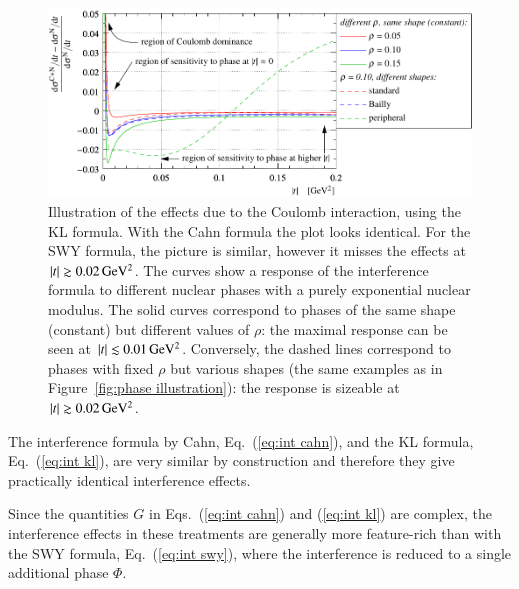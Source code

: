 \begin{figure}
\begin{center}
\includegraphics{fig/cni_effect_illustration.pdf}
\caption{%
Illustration of the effects due to the Coulomb interaction, using the KL formula. With the Cahn formula the plot looks identical. For the SWY formula, the picture is similar, however it misses the effects at $|t| \gtrsim 0.02\,{\rm GeV^2}$. The curves show a response of the interference formula to different nuclear phases with a purely exponential nuclear modulus. The solid curves correspond to phases of the same shape (constant) but different values of $\rho$: the maximal response can be seen at $|t| \lesssim 0.01\,{\rm GeV^2}$. Conversely, the dashed lines correspond to phases with fixed $\rho$ but various shapes (the same examples as in Figure~\ref{fig:phase illustration}): the response is sizeable at $|t| \gtrsim 0.02\,{\rm GeV^2}$.
}
\label{fig:cni effect}
\end{center}
\end{figure}

The interference formula by Cahn, Eq.~(\ref{eq:int cahn}), and the KL formula, Eq.~(\ref{eq:int kl}), are very similar by construction and therefore they give practically identical interference effects.

Since the quantities $G$ in Eqs.~(\ref{eq:int cahn}) and (\ref{eq:int kl}) are complex, the interference effects in these treatments are generally more feature-rich than with the SWY formula, Eq.~(\ref{eq:int swy}), where the interference is reduced to a single additional phase $\Phi$.

